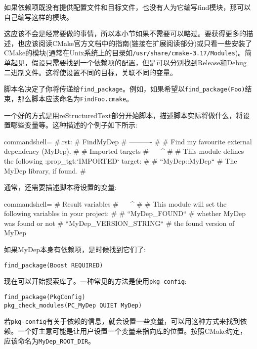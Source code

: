 
如果依赖项既没有提供配置文件和目标文件，也没有人为它编写find模块，那可以自己编写这样的模块。

这应该不会是经常要做的事情，所以本小节如果不需要可以略过。要获得更多的描述，也应该阅读CMake官方文档中的指南(链接在扩展阅读部分)或只看一些安装了CMake的模块(通常在Unix系统上的目录如\texttt{/usr/share/cmake-3.17/Modules})。简单起见，假设只需要找到一个依赖项的配置，但是可以分别找到Release和Debug二进制文件。这将使设置不同的目标，关联不同的变量。

脚本名决定了你将传递给\texttt{find\_package}。例如，如果希望以\texttt{find\_package(Foo)}结束，那么脚本应该命名为\texttt{FindFoo.cmake}。

一个好的方式是用reStructuredText部分开始脚本，描述脚本实际将做什么，将设置哪些变量等。这种描述的个例子如下所示:

\begin{tcblisting}{commandshell={}}
#.rst:
# FindMyDep
# ----------
#
# Find my favourite external dependency (MyDep).
#
# Imported targets
# ^^^^^^^^^^^^^^^^
#
# This module defines the following :prop_tgt:`IMPORTED` target:
#
# ``MyDep::MyDep``
# The MyDep library, if found.
#
\end{tcblisting}

通常，还需要描述脚本将设置的变量:

\begin{tcblisting}{commandshell={}}
# Result variables
# ^^^^^^^^^^^^^^^^
#
# This module will set the following variables in your project:
#
# ``MyDep_FOUND``
# whether MyDep was found or not
# ``MyDep_VERSION_STRING``
# the found version of MyDep
\end{tcblisting}

如果MyDep本身有依赖项，是时候找到它们了:

\begin{lstlisting}[style=styleCMake]
find_package(Boost REQUIRED)
\end{lstlisting}

现在可以开始搜索库了。一种常见的方法是使用\texttt{pkg-config}:

\begin{lstlisting}[style=styleCMake]
find_package(PkgConfig)
pkg_check_modules(PC_MyDep QUIET MyDep)
\end{lstlisting}

若\texttt{pkg-config}有关于依赖的信息，就会设置一些变量，可以用这种方式来找到依赖。一个好主意可能是让用户设置一个变量来指向库的位置。按照CMake约定，应该命名为\texttt{MyDep\_ROOT\_DIR}。

